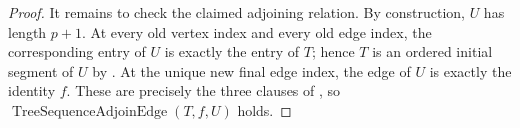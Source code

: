 \begin{proof}
It remains to check the claimed adjoining relation.  By construction,
$U$ has length $p+1$.  At every old vertex index and every old edge index,
the corresponding entry of $U$ is exactly the entry of $T$; hence $T$ is
an ordered initial segment of $U$ by
.  At the unique new final edge index,
the edge of $U$ is exactly the identity $f$.  These are precisely the three
clauses of , so
$\operatorname{TreeSequenceAdjoinEdge}(T,f,U)$ holds.
\end{proof}
